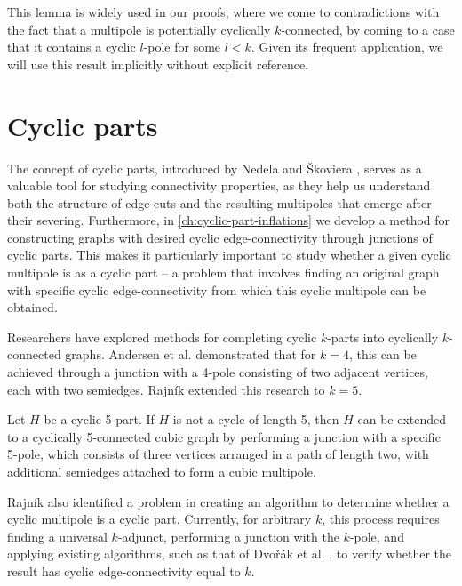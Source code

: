 \documentclass[12pt, twoside]{book}
\begin{document}
This lemma is widely used in our proofs, where we come to contradictions with the fact that a multipole is potentially cyclically $k$-connected, by coming to a case that it contains a cyclic $l$-pole for some $l<k$. Given its frequent application, we will use this result implicitly without explicit reference.

\section{Cyclic parts}\label{sec:cyclic-part-results}

The concept of cyclic parts, introduced by Nedela and Škoviera \cite{atoms-of-cyclic}, serves as a valuable tool for studying connectivity properties, as they help us understand both the structure of edge-cuts and the resulting multipoles that emerge after their severing. Furthermore, in \cref{ch:cyclic-part-inflations} we develop a method for constructing graphs with desired cyclic edge-connectivity through junctions of cyclic parts. This makes it particularly important to study whether a given cyclic multipole is as a cyclic part -- a problem that involves finding an original graph with specific cyclic edge-connectivity from which this cyclic multipole can be obtained.

Researchers have explored methods for completing cyclic $k$-parts into cyclically $k$-connected graphs. Andersen et al. \cite{Andersen1988} demonstrated that for $k=4$, this can be achieved through a junction with a 4-pole consisting of two adjacent vertices, each with two semiedges. Rajník \cite{Rajnik_phd} extended this research to $k=5$.

\begin{theorem}
	Let $H$ be a cyclic 5-part. If $H$ is not a cycle of length 5, then $H$ can be extended to a cyclically 5-connected cubic graph by performing a junction with a specific 5-pole, which consists of three vertices arranged in a path of length two, with additional semiedges attached to form a cubic multipole.
\end{theorem}

Rajník \cite{Rajnik_phd} also identified a problem in creating an algorithm to determine whether a cyclic multipole is a cyclic part. Currently, for arbitrary $k$, this process requires finding a universal $k$-adjunct, performing a junction with the $k$-pole, and applying existing algorithms, such as that of Dvořák et al. \cite{Dvorak2004}, to verify whether the result has cyclic edge-connectivity equal to $k$.
\end{document}
